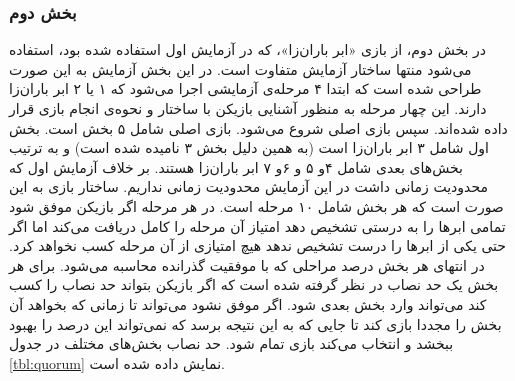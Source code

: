 \documentclass[twoside, a4paper,11pt]{book}
\numberwithin{equation}{chapter}
\numberwithin{table}{chapter}
\numberwithin{figure}{chapter}
\numberwithin{equation}{chapter}
\begin{document}
\subsubsection{بخش دوم}

در بخش دوم، از بازی «ابر باران‌زا»، که در آزمایش اول استفاده شده بود، استفاده می‌شود منتها ساختار آزمایش متفاوت است. در این بخش آزمایش به این صورت طراحی شده است که ابتدا ۴ مرحله‌ی آزمایشی اجرا می‌شود که ۱ یا ۲ ابر باران‌زا دارند. این چهار مرحله به منظور آشنایی بازیکن با ساختار و نحوه‌ی انجام بازی قرار داده شده‌اند. سپس بازی اصلی شروع می‌شود. بازی اصلی شامل ۵ بخش است. بخش اول شامل ۳ ابر باران‌زا است (به همین دلیل بخش ۳ نامیده شده است) و به ترتیب بخش‌های بعدی شامل ۴و ۵ و ۶و ۷ ابر باران‌زا هستند. بر خلاف آزمایش اول که محدودیت زمانی داشت در این آزمایش محدودیت زمانی نداریم. ساختار بازی به این صورت است که هر بخش شامل ۱۰ مرحله است. در هر مرحله اگر بازیکن موفق شود تمامی ابرها را به درستی تشخیص دهد امتیاز آن مرحله را کامل دریافت می‌کند اما اگر حتی یکی از ابرها را درست تشخیص ندهد هیچ امتیازی از آن مرحله کسب نخواهد کرد. در انتهای هر بخش درصد مراحلی که با موفقیت گذرانده محاسبه می‌شود. برای هر بخش یک حد نصاب در نظر گرفته شده است که اگر بازیکن بتواند حد نصاب را کسب کند می‌تواند وارد بخش بعدی شود. اگر موفق نشود می‌تواند تا زمانی که بخواهد آن بخش را مجددا بازی کند تا جایی که به این نتیجه برسد که نمی‌تواند این درصد را بهبود ببخشد و انتخاب می‌کند بازی تمام شود. حد نصاب بخش‌های مختلف در جدول \ref{tbl:quorum} نمایش داده شده است. 

\begin{table}[]
\end{table}
\end{document}
